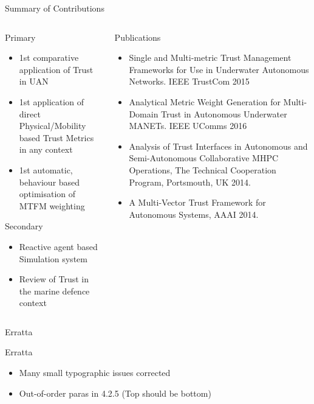 \documentclass[aspectratio=169]{beamer}
\begin{document}
\begin{frame}{Summary of Contributions}
  \begin{columns}
    \begin{column}{0.45\textwidth}
	  \begin{exampleblock}{Primary}
	  \begin{itemize}
	    \item 1st comparative application of Trust in UAN
	    \item 1st application of direct Physical/Mobility based Trust Metrics in any context
	    \item 1st automatic, behaviour based optimisation of MTFM weighting
	  \end{itemize}
	  \end{exampleblock}
	  \begin{block}{Secondary}
	  \begin{itemize}
	    \item Reactive agent based Simulation system
	    \item Review of Trust in the marine defence context
	  \end{itemize}
	  \end{block}
    \end{column}
    \begin{column}{0.55\textwidth}
      \begin{block}{Publications}
        \begin{itemize}  
          \item Single and Multi-metric Trust Management Frameworks for Use in Underwater Autonomous Networks. IEEE TrustCom 2015
          \item Analytical Metric Weight Generation for Multi-Domain Trust in Autonomous Underwater MANETs. IEEE UComms 2016
          \item Analysis of Trust Interfaces in Autonomous and Semi-Autonomous Collaborative MHPC Operations, The Technical Cooperation Program, Portsmouth, UK 2014.
          \item A Multi-Vector Trust Framework for Autonomous Systems, AAAI 2014.
        \end{itemize}  
      \end{block}
    \end{column}
  \end{columns}
\end{frame}

\begin{frame}{Erratta}
	\begin{alertblock}{Erratta}
		\begin{itemize}
			\item Many small typographic issues corrected
			\item Out-of-order paras in 4.2.5 (Top should be bottom)
		\end{itemize}
	\end{alertblock}
	
\end{frame}
\end{document}
